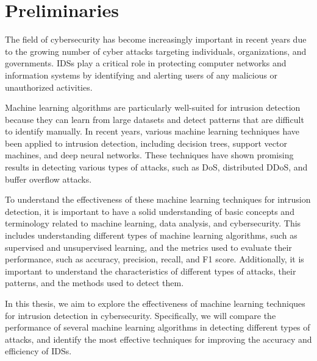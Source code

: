 \chapter{Preliminaries}
The field of cybersecurity has become increasingly important in recent years due to the growing number of cyber attacks targeting individuals, organizations, and governments. \Acp{IDS} play a critical role in protecting computer networks and information systems by identifying and alerting users of any malicious or unauthorized activities.

Machine learning algorithms are particularly well-suited for intrusion detection because they can learn from large datasets and detect patterns that are difficult to identify manually. In recent years, various machine learning techniques have been applied to intrusion detection, including decision trees, support vector machines, and deep neural networks. These techniques have shown promising results in detecting various types of attacks, such as \ac{DoS}, distributed \ac{DDoS}, and buffer overflow attacks.

To understand the effectiveness of these machine learning techniques for intrusion detection, it is important to have a solid understanding of basic concepts and terminology related to machine learning, data analysis, and cybersecurity. This includes understanding different types of machine learning algorithms, such as supervised and unsupervised learning, and the metrics used to evaluate their performance, such as accuracy, precision, recall, and F1 score. Additionally, it is important to understand the characteristics of different types of attacks, their patterns, and the methods used to detect them.

In this thesis, we aim to explore the effectiveness of machine learning techniques for intrusion detection in cybersecurity. Specifically, we will compare the performance of several machine learning algorithms in detecting different types of attacks, and identify the most effective techniques for improving the accuracy and efficiency of \acp{IDS}.
